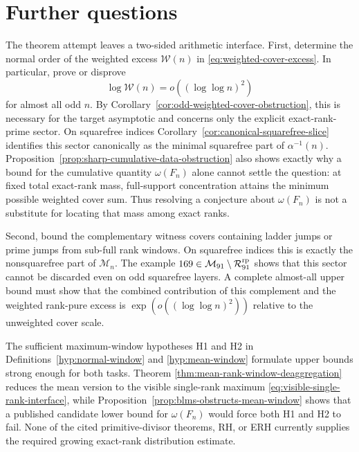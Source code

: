 \section{Further questions}\label{sec:questions}

The theorem attempt leaves a two-sided arithmetic interface.  First,
determine the normal order of the weighted excess $\mathcal W(n)$ in
\eqref{eq:weighted-cover-excess}.  In particular, prove or disprove
\[
 \log\mathcal W(n)=o((\log\log n)^2)
\]
for almost all odd $n$.  By
Corollary~\ref{cor:odd-weighted-cover-obstruction}, this is necessary for the
target asymptotic and concerns only the explicit exact-rank-prime sector.
On squarefree indices Corollary~\ref{cor:canonical-squarefree-slice} identifies
this sector canonically as the minimal squarefree part of $\alpha^{-1}(n)$.
Proposition~\ref{prop:sharp-cumulative-data-obstruction} also shows exactly
why a bound for the cumulative quantity $\omega(F_n)$ alone cannot settle the
question: at fixed total exact-rank mass, full-support concentration attains
the minimum possible weighted cover sum. Thus resolving a conjecture about
$\omega(F_n)$ is not a substitute for locating that mass among exact ranks.

Second, bound the complementary witness covers containing ladder jumps or
prime jumps from sub-full rank windows. On squarefree indices this is exactly
the nonsquarefree part of $\mathcal M_n$. The example
$169\in\mathcal M_{91}\setminus\mathcal R_{91}^{\rm rp}$ shows that this
sector cannot be discarded even on odd squarefree layers.  A complete
almost-all upper bound must show that the combined contribution of this
complement and the weighted rank-pure excess is
$\exp(o((\log\log n)^2))$ relative to the unweighted cover scale.

The sufficient maximum-window hypotheses H1 and H2 in
Definitions~\ref{hyp:normal-window} and \ref{hyp:mean-window} formulate
upper bounds strong enough for both tasks.  Theorem
\ref{thm:mean-rank-window-deaggregation} reduces the mean version to the
visible single-rank maximum \eqref{eq:visible-single-rank-interface}, while
Proposition~\ref{prop:blms-obstructs-mean-window} shows that a published
candidate lower bound for \(\omega(F_n)\) would force both H1 and H2 to fail.
None of the
cited primitive-divisor theorems, RH, or ERH currently supplies the required
growing exact-rank distribution estimate.

